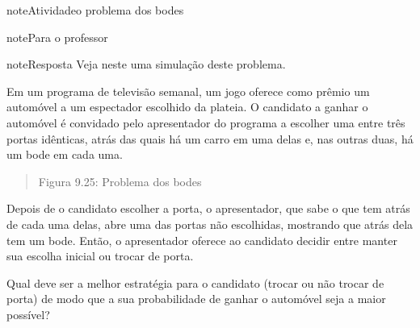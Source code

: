 \begin{sphinxadmonition}{note}{Atividade}{o problema dos bodes}
\begin{sphinxadmonition}{note}{Para o professor}
\begin{sphinxadmonition}{note}{Resposta}
Veja neste  uma simulação deste problema.
\end{sphinxadmonition}
\end{sphinxadmonition}

Em um programa de televisão semanal, um jogo oferece como prêmio um automóvel a um espectador escolhido da plateia. O candidato a ganhar o automóvel é convidado pelo apresentador do programa a escolher uma entre três portas idênticas, atrás das quais há um carro em uma delas e, nas outras duas, há um bode em cada uma.
\begin{quote}

\begin{figure}[H]
\centering

\noindent{}
\end{figure}

Figura 9.25: Problema dos bodes
\end{quote}

Depois de o candidato escolher a porta, o apresentador, que sabe o que tem atrás de cada uma delas, abre uma das portas não escolhidas, mostrando que atrás dela tem um bode. Então, o apresentador oferece ao candidato decidir entre manter sua escolha inicial ou trocar de porta.

Qual deve ser a melhor estratégia para o candidato (trocar ou não trocar de porta) de modo que a sua probabilidade de ganhar o automóvel seja a maior possível?
\end{sphinxadmonition}
